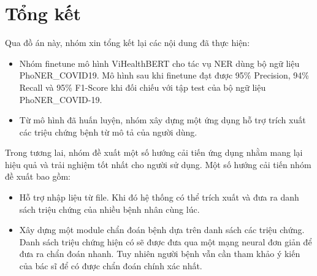 \section{Tổng kết}
Qua đồ án này, nhóm xin tổng kết lại các nội dung đã thực hiện:
\begin{itemize}
\item Nhóm finetune mô hình ViHealthBERT cho tác vụ NER dùng bộ ngữ liệu PhoNER\_COVID19. Mô hình sau khi finetune đạt được 95\% Precision, 94\% Recall và 95\% F1-Score khi đối chiếu với tập test của bộ ngữ liệu PhoNER\_COVID-19.

\item Từ mô hình đã huấn luyện, nhóm xây dựng một ứng dụng hỗ trợ trích xuất các triệu chứng bệnh từ mô tả của người dùng.
\end{itemize}
Trong tương lai, nhóm đề xuất một số hướng cải tiến ứng dụng nhằm mang lại hiệu quả và trải nghiệm tốt nhất cho người sử dụng. Một số hướng cải tiến nhóm đề xuất bao gồm:
\begin{itemize}
\item Hỗ trợ nhập liệu từ file. Khi đó hệ thống có thể trích xuất và đưa ra danh sách triệu chứng của nhiều bệnh nhân cùng lúc.

\item Xây dựng một module chẩn đoán bệnh dựa trên danh sách các triệu chứng. Danh sách triệu chứng hiện có sẽ được đưa qua một mạng neural đơn giản để đưa ra chẩn đoán nhanh. Tuy nhiên người bệnh vẫn cần tham khảo ý kiến của bác sĩ để có được chẩn đoán chính xác nhất.
\end{itemize}